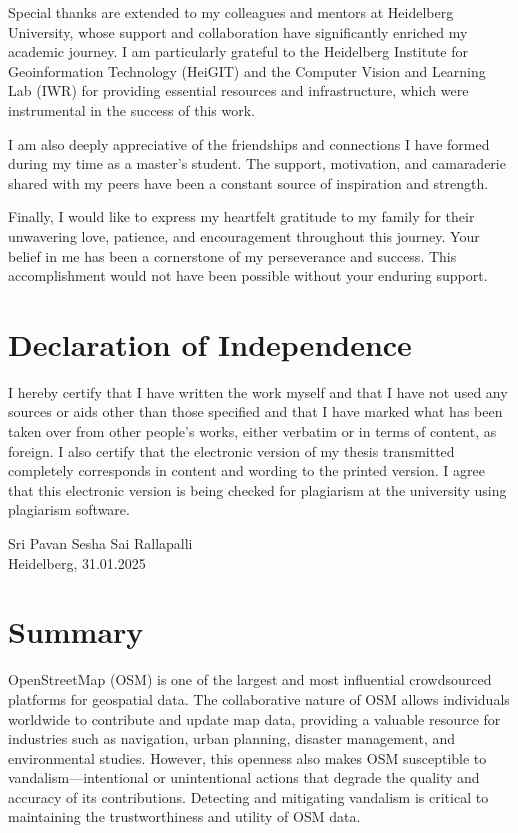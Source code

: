 \documentclass[
    13pt, %
    a4paper, %
    DIV14, %
    listof=totoc, %
    bibliography=totoc, %
    index=totoc, %
    headsepline
]{scrreprt}
\begin{document}
Special thanks are extended to my colleagues and mentors at Heidelberg University, whose support and collaboration have significantly enriched my academic journey. I am particularly grateful to the Heidelberg Institute for Geoinformation Technology (HeiGIT) and the Computer Vision and Learning Lab (IWR) for providing essential resources and infrastructure, which were instrumental in the success of this work.

I am also deeply appreciative of the friendships and connections I have formed during my time as a master’s student. The support, motivation, and camaraderie shared with my peers have been a constant source of inspiration and strength.

Finally, I would like to express my heartfelt gratitude to my family for their unwavering love, patience, and encouragement throughout this journey. Your belief in me has been a cornerstone of my perseverance and success. This accomplishment would not have been possible without your enduring support.

\newpage
\section*{\LARGE Declaration of Independence}
I hereby certify that I have written the work myself and that I have not used any sources
or aids other than those specified and that I have marked what has been taken over from
other people’s works, either verbatim or in terms of content, as foreign. I also certify
that the electronic version of my thesis transmitted completely corresponds in content
and wording to the printed version. I agree that this electronic version is being checked
for plagiarism at the university using plagiarism software.

\vspace*{50pt}

\noindent
Sri Pavan Sesha Sai Rallapalli\\
Heidelberg, 31.01.2025

\newpage

\section*{\LARGE Summary}

OpenStreetMap (OSM) is one of the largest and most influential crowdsourced platforms for geospatial data. The collaborative nature of OSM allows individuals worldwide to contribute and update map data, providing a valuable resource for industries such as navigation, urban planning, disaster management, and environmental studies. However, this openness also makes OSM susceptible to vandalism—intentional or unintentional actions that degrade the quality and accuracy of its contributions. Detecting and mitigating vandalism is critical to maintaining the trustworthiness and utility of OSM data.
\end{document}
